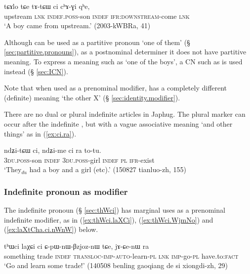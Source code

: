 \begin{exe}
\ex \label{ex:ci.chAGi}
\gll tɕɤlo tɕe tɤ-tɕɯ ci cʰɤ-ɣi qʰe, \\
upstream \textsc{lnk} \textsc{indef}.\textsc{poss}-son \textsc{indef} \textsc{ifr}:\textsc{downstream}-come \textsc{lnk} \\
\glt `A boy came from upstream.' (2003-kWBRa, 41)
\end{exe}

Although  can be used as a partitive pronoun `one of them' (§ \ref{sec:partitive.pronouns}), as a postnominal determiner it does not have partitive meaning. To express a meaning such as `one of the boys', a CN such as  is used instead (§ \ref{sec:ICN}). 

Note that when used as a prenominal modifier,  has a completely different (definite) meaning `the other X' (§ \ref{sec:identity.modifier}). 

There are no dual or plural indefinite articles in Japhug. The plural marker  can occur after the indefinite , but with a vague associative meaning `and other things' as in (\ref{ex:ci.ra}).

\begin{exe}
\ex \label{ex:ci.ra}
 \gll  ndʑi-tɕɯ ci, ndʑi-me ci ra to-tu. \\
 \textsc{3du}.\textsc{poss}-son \textsc{indef}  \textsc{3du}.\textsc{poss}-girl \textsc{indef} \textsc{pl} \textsc{ifr}-exist \\
 \glt  `They$_{du}$ had a boy and a girl (etc).' (150827 tianluo-zh, 155)
\end{exe}

\subsubsection{Indefinite pronoun as modifier} \label{sec:indefinite}
The indefinite pronoun  (§ \ref{sec:thWci}) has marginal uses as a prenominal indefinite modifier, as in  (\ref{ex:thWci.laXCi}), (\ref{ex:thWci.WjmNo}) and (\ref{ex:laXtCha.ci.nWnW}) below. 

\begin{exe}
\ex \label{ex:thWci.laXCi}
\gll   tʰɯci laχɕi ci ɕ-pɯ-nɯ-βzjoz-nɯ tɕe, jɤ-ɕe-nɯ ra \\
something trade \textsc{indef} \textsc{transloc-imp-auto}-learn-\textsc{pl} \textsc{lnk} \textsc{imp}-go-\textsc{pl} have.to:\textsc{fact} \\
\glt `Go and learn some trade!' (140508 benling gaoqiang de si xiongdi-zh, 29)
 \end{exe}
 
